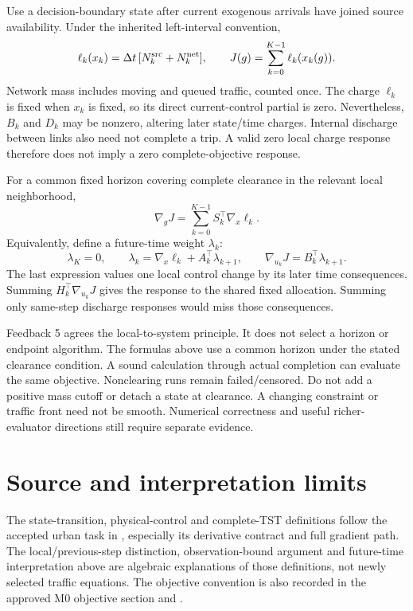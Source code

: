 \documentclass[11pt]{article}
\begin{document}
Use a decision-boundary state after current exogenous arrivals have joined source availability. Under the inherited left-interval convention,
\begin{equation}
 \ell_k(x_k)=\Delta t\,[N_k^{\rm src}+N_k^{\rm net}],\qquad
 J(g)=\sum_{k=0}^{K-1}\ell_k(x_k(g)).
 \label{eq:tst}
\end{equation}
Network mass includes moving and queued traffic, counted once. The charge $\ell_k$ is fixed when $x_k$ is fixed, so its direct current-control partial is zero. Nevertheless, $B_k$ and $D_k$ may be nonzero, altering later state/time charges. Internal discharge between links also need not complete a trip. A valid zero local charge response therefore does not imply a zero complete-objective response.

For a common fixed horizon covering complete clearance in the relevant local neighborhood,
\begin{equation}
 \nabla_gJ=\sum_{k=0}^{K-1}S_k^\top\nabla_x\ell_k.
 \label{eq:tstgradient}
\end{equation}
Equivalently, define a future-time weight $\lambda_k$:
\begin{equation}
 \lambda_K=0,\qquad
 \lambda_k=\nabla_x\ell_k+A_k^\top\lambda_{k+1},\qquad
 \nabla_{u_k}J=B_k^\top\lambda_{k+1}.
 \label{eq:adjoint}
\end{equation}
The last expression values one local control change by its later time consequences. Summing $H_k^\top\nabla_{u_k}J$ gives the response to the shared fixed allocation. Summing only same-step discharge responses would miss those consequences.

Feedback 5 agrees the local-to-system principle. It does not select a horizon or endpoint algorithm. The formulas above use a common horizon under the stated clearance condition. A sound calculation through actual completion can evaluate the same objective. Nonclearing runs remain failed/censored. Do not add a positive mass cutoff or detach a state at clearance. A changing constraint or traffic front need not be smooth. Numerical correctness and useful richer-evaluator directions still require separate evidence.

\section*{Source and interpretation limits}

The state-transition, physical-control and complete-TST definitions follow the accepted urban task in , especially its derivative contract and full gradient path. The local/previous-step distinction, observation-bound argument and future-time interpretation above are algebraic explanations of those definitions, not newly selected traffic equations. The objective convention is also recorded in the approved M0 objective section and .
\end{document}

